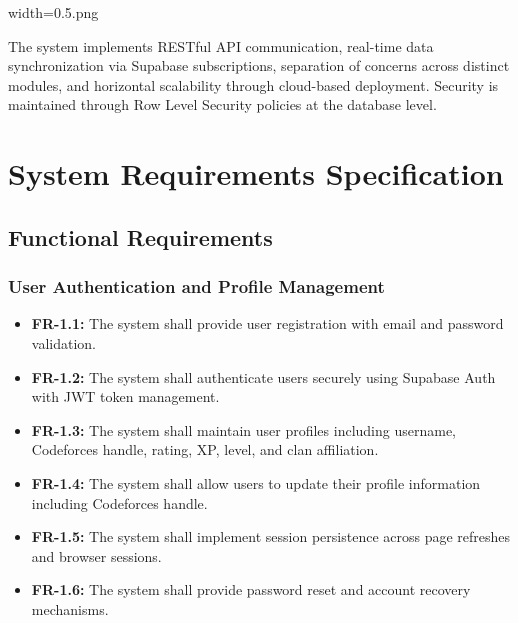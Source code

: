 width=0.5\linewidthimage.png\documentclass[12pt,a4paper]{article}
\begin{document}
The system implements RESTful API communication, real-time data synchronization via Supabase subscriptions, separation of concerns across distinct modules, and horizontal scalability through cloud-based deployment. Security is maintained through Row Level Security policies at the database level.

\FloatBarrier

\section{System Requirements Specification}

\subsection{Functional Requirements}

\subsubsection{User Authentication and Profile Management}
\begin{itemize}
\item \textbf{FR-1.1:} The system shall provide user registration with email and password validation.
\item \textbf{FR-1.2:} The system shall authenticate users securely using Supabase Auth with JWT token management.
\item \textbf{FR-1.3:} The system shall maintain user profiles including username, Codeforces handle, rating, XP, level, and clan affiliation.
\item \textbf{FR-1.4:} The system shall allow users to update their profile information including Codeforces handle.
\item \textbf{FR-1.5:} The system shall implement session persistence across page refreshes and browser sessions.
\item \textbf{FR-1.6:} The system shall provide password reset and account recovery mechanisms.
\end{itemize}
\end{document}
